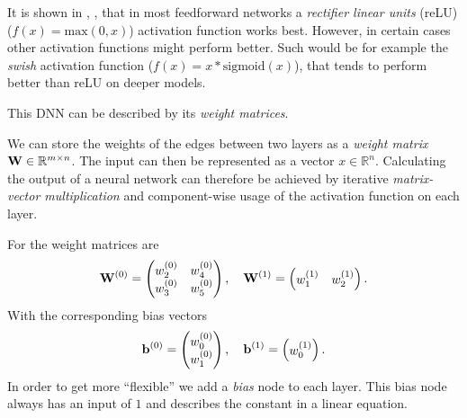 It is shown in  \cite{Nair-Hinton}, \cite{inproceedings}, that in most feedforward networks a \emph{rectifier linear units} (reLU) (\(f(x) = \text{max}(0, x)\)) activation function works best.
However, in certain cases other activation functions might perform better.
Such would be for example the \emph{swish} activation function (\(f(x) = x * \text{sigmoid}(x)\)), that tends to perform better than reLU on deeper models. \cite{DBLP:journals/corr/abs-1710-05941}



This DNN  can be described by its \emph{weight matrices}.

We can store the weights of the edges between two layers as a \emph{weight matrix} \(\mathbf{W} \in \mathbb{R}^{m \times n}\).
The input can then be represented as a vector \({x \in \mathbb{R}^n}\).
Calculating the output of a neural network can therefore be achieved by iterative \emph{matrix-vector multiplication} and component-wise usage of the activation function on each layer.

For  the weight matrices are
\begin{equation}
    \mathbf{W}^{(0)} =
    \begin{pmatrix}
        w_{2}^{(0)} & w_{4}^{(0)} \\
        w_{3}^{(0)} & w_{5}^{(0)}
    \end{pmatrix}, \quad
    \mathbf{W}^{(1)} = 
    \begin{pmatrix}
        w_{1}^{(1)} & w_{2}^{(1)}
    \end{pmatrix}.
\end{equation}
With the corresponding bias vectors
\begin{equation}
    \mathbf{b}^{(0)} =
    \begin{pmatrix}
        w_{0}^{(0)} \\
        w_{1}^{(0)}
    \end{pmatrix}, \quad
    \mathbf{b}^{(1)} =
    \begin{pmatrix}
        w_{0}^{(1)}
    \end{pmatrix}.
\end{equation}
In order to get more \enquote{flexible} we add a \emph{bias} node to each layer.
This bias node always has an input of \(1\) and describes the constant in a linear equation.

